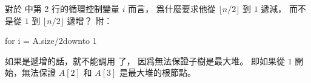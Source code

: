 \startEXERCISE
對於  中第 2 行的循環控制變量 $i$ 而言，
爲什麼要求他從 $\lfloor n/2 \rfloor$ 到 $1$ 遞減，
而不是從 $1$ 到 $\lfloor n/2 \rfloor$ 遞增？
附：

\startCLRSCODE
for i = \lfloor A.size/2\rfloor downto 1
\stopCLRSCODE
\stopEXERCISE

\startANSWER
如果是遞增的話，就不能調用  了，
因爲無法保證子樹是最大堆。
即如果從 $1$ 開始，無法保證 $A[2]$ 和 $A[3]$ 是最大堆的根節點。
\stopANSWER
